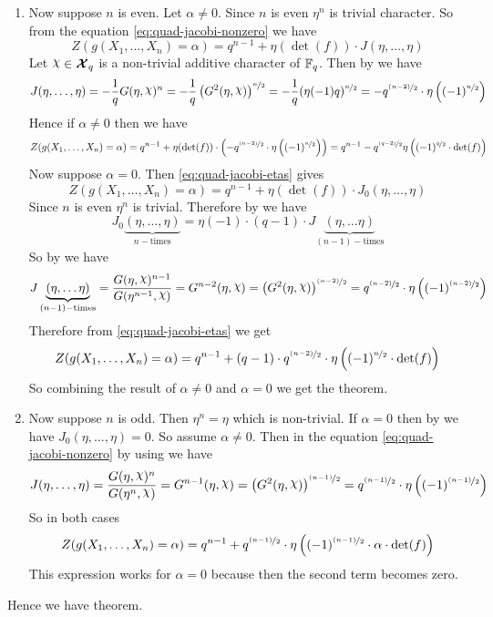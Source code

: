 \begin{alternate-proof}
\begin{enumerate}[label=(\roman*)]
      \item Now suppose $n$ is even. Let $\alpha\neq 0$. Since $n$ is even $\eta^n$ is trivial character. So from the equation  \eqref{eq:quad-jacobi-nonzero} we have $$Z(g(X_1,\dots, X_n)=\alpha) =q^{n-1}+\eta(\det(f))\cdot J(\eta,\dots, \eta)$$ Let $\chi\in\Xq$ is a non-trivial additive character of $\mathbb{F}_q$. Then by \JGrelthm[(ii)] we have $$J(\eta,\dots, \eta) = -\frac1qG(\eta,\chi)^n = -\frac1q\lt(G^2(\eta,\chi)\rt)^{\nicefrac{n}{2}} = -\frac1q(\eta(-1)q)^{\nicefrac{n}2} = -q^{\nicefrac{(n-2)}{2}}\cdot \eta\lt((-1)^{\nicefrac{n}2}\rt)$$Hence if $\alpha\neq 0$ then we have $$Z(g(X_1,\dots, X_n)=\alpha)=q^{n-1}+\eta(\det(f))\cdot \left(-q^{\nicefrac{(n-2)}{2}}\cdot \eta\left((-1)^{\nicefrac{n}2}\right)\right)=q^{n-1}-q^{\nicefrac{(q-2)}{2}}\eta\left((-1)^{\nicefrac{q}{2}}\cdot \det(f)\right)$$
      Now suppose $\alpha= 0$. Then \eqref{eq:quad-jacobi-etas} gives $$Z(g(X_1,\dots, X_n)=\alpha) =q^{n-1}+\eta(\det(f))\cdot J_{0}(\eta,\dots, \eta)$$Since $n$ is even $\eta^n$ is trivial. Therefore by \JacZeroRellem[(ii)] we have $$J_0\underbrace{(\eta,\dots, \eta)}_{n-\text{times}}=\eta(-1)\cdot (q-1)\cdot J\underbrace{(\eta,\dots\eta)}_{(n-1)-\text{times}}$$So by \JGrelthm[(i)] we have $$J\underbrace{(\eta,\dots\eta)}_{(n-1)-\text{times}}=\frac{G(\eta,\chi)^{n-1}}{G(\eta^{n-1},\chi)}=G^{n-2}(\eta,\chi)=\lt(G^2(\eta,\chi)\rt)^{\nicefrac{(n-2)}{2}}= q^{\nicefrac{(n-2)}{2}}\cdot \eta\lt((-1)^{\nicefrac{(n-2)}{2}}\rt)$$Therefore from \eqref{eq:quad-jacobi-etas} we get $$Z(g(X_1,\dots, X_n)=\alpha)=q^{n-1}+(q-1)\cdot q^{\nicefrac{(n-2)}{2}}\cdot \eta\left((-1)^{\nicefrac{n}{2}}\cdot \det(f)\right)$$
      So combining the result of $\alpha\neq 0$ and $\alpha=0$ we get the theorem. 
      \item Now suppose $n$ is odd. Then $\eta^n=\eta$ which is non-trivial. If $\alpha=0$ then by \JacZeroRellem[(i)] we have $J_0(\eta,\dots,\eta)=0$. So assume $\alpha\neq 0$. Then in the equation \eqref{eq:quad-jacobi-nonzero} by using \JGrelthm[(i)] we have
      $$J(\eta,\dots,\eta)=\frac{G(\eta,\chi)^{n}}{G(\eta^{n},\chi)}=G^{n-1}(\eta,\chi)=\lt(G^2(\eta,\chi)\rt)^{\nicefrac{(n-1)}{2}}= q^{\nicefrac{(n-1)}{2}}\cdot \eta\lt((-1)^{\nicefrac{(n-1)}{2}}\rt)$$So in both cases $$Z(g(X_1,\dots, X_n)=\alpha) =q^{n-1}+ q^{\nicefrac{(n-1)}{2}}\cdot \eta\left((-1)^{\nicefrac{(n-1)}{2}}\cdot \alpha\cdot \det(f)\right)$$This expression works for $\alpha=0$ because then the second term becomes zero. 
    \end{enumerate}
    Hence we have theorem. 
\end{alternate-proof}

